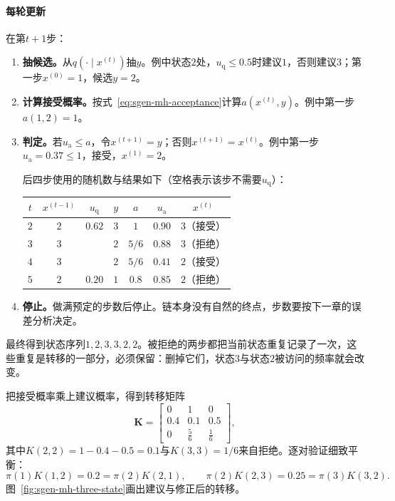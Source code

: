 \paragraph{每轮更新}
在第$t+1$步：
\begin{enumerate}
  \item \textbf{抽候选。}从$q(\cdot\mid x^{(t)})$抽$y$。例中状态$2$处，$u_{\mathrm{q}}\le0.5$时建议$1$，否则建议$3$；第一步$x^{(0)}=1$，候选$y=2$。

  \item \textbf{计算接受概率。}按式~\eqref{eq:sgen-mh-acceptance}计算$a(x^{(t)},y)$。例中第一步$a(1,2)=1$。

  \item \textbf{判定。}若$u_{\mathrm{a}}\le a$，令$x^{(t+1)}=y$；否则$x^{(t+1)}=x^{(t)}$。例中第一步$u_{\mathrm{a}}=0.37\le1$，接受，$x^{(1)}=2$。

  后四步使用的随机数与结果如下（空格表示该步不需要$u_{\mathrm{q}}$）：
  \begin{center}
    \small
    \begin{tabular}{@{}ccccccc@{}}
      \toprule
      $t$ & $x^{(t-1)}$ & $u_{\mathrm{q}}$ & $y$ & $a$ & $u_{\mathrm{a}}$ & $x^{(t)}$\\
      \midrule
      $2$ & $2$ & $0.62$ & $3$ & $1$ & $0.90$ & $3$（接受）\\
      $3$ & $3$ & & $2$ & $5/6$ & $0.88$ & $3$（拒绝）\\
      $4$ & $3$ & & $2$ & $5/6$ & $0.41$ & $2$（接受）\\
      $5$ & $2$ & $0.20$ & $1$ & $0.8$ & $0.85$ & $2$（拒绝）\\
      \bottomrule
    \end{tabular}
  \end{center}

  \item \textbf{停止。}做满预定的步数后停止。链本身没有自然的终点，步数要按下一章的误差分析决定。
\end{enumerate}
最终得到状态序列$1,2,3,3,2,2$。被拒绝的两步都把当前状态重复记录了一次，这些重复是转移的一部分，必须保留：删掉它们，状态$3$与状态$2$被访问的频率就会改变。

把接受概率乘上建议概率，得到转移矩阵
\[
  \bm{K}=\begin{bmatrix}0&1&0\\0.4&0.1&0.5\\0&\frac56&\frac16\end{bmatrix},
\]
其中$K(2,2)=1-0.4-0.5=0.1$与$K(3,3)=1/6$来自拒绝。逐对验证细致平衡：
\[
  \pi(1)K(1,2)=0.2=\pi(2)K(2,1),\qquad \pi(2)K(2,3)=0.25=\pi(3)K(3,2).
\]
图~\ref{fig:sgen-mh-three-state}画出建议与修正后的转移。

